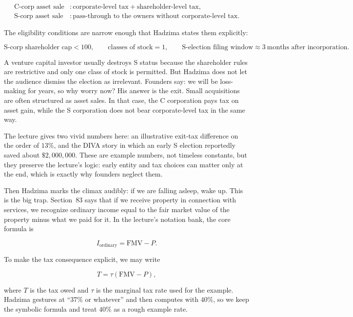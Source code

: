 \begin{align}
\text{C-corp asset sale} &: \text{corporate-level tax} + \text{shareholder-level tax},\\
\text{S-corp asset sale} &: \text{pass-through to the owners without corporate-level tax}.
\end{align}

The eligibility conditions are narrow enough that Hadzima states them explicitly:

\begin{equation}
\text{S-corp shareholder cap}<100,
\qquad
\text{classes of stock}=1,
\qquad
\text{S-election filing window}\approx 3\ \text{months after incorporation}.
\end{equation}

A venture capital investor usually destroys S status because the shareholder rules are restrictive and only one class of stock is permitted. But Hadzima does not let the audience dismiss the election as irrelevant. Founders say: we will be loss-making for years, so why worry now? His answer is the exit. Small acquisitions are often structured as asset sales. In that case, the C corporation pays tax on asset gain, while the S corporation does not bear corporate-level tax in the same way.

The lecture gives two vivid numbers here: an illustrative exit-tax difference on the order of \(13\%\), and the DIVA story in which an early S election reportedly saved about \(\$2{,}000{,}000\). These are example numbers, not timeless constants, but they preserve the lecture's logic: early entity and tax choices can matter only at the end, which is exactly why founders neglect them.

Then Hadzima marks the climax audibly: if we are falling asleep, wake up. This is the big trap. Section~83 says that if we receive property in connection with services, we recognize ordinary income equal to the fair market value of the property minus what we paid for it. In the lecture's notation bank, the core formula is

\begin{equation}
I_{\text{ordinary}}=\mathrm{FMV}-P.
\end{equation}

To make the tax consequence explicit, we may write

\begin{equation}
T=\tau(\mathrm{FMV}-P),
\end{equation}

where \(T\) is the tax owed and \(\tau\) is the marginal tax rate used for the example. Hadzima gestures at ``\(37\%\) or whatever'' and then computes with \(40\%\), so we keep the symbolic formula and treat \(40\%\) as a rough example rate.

